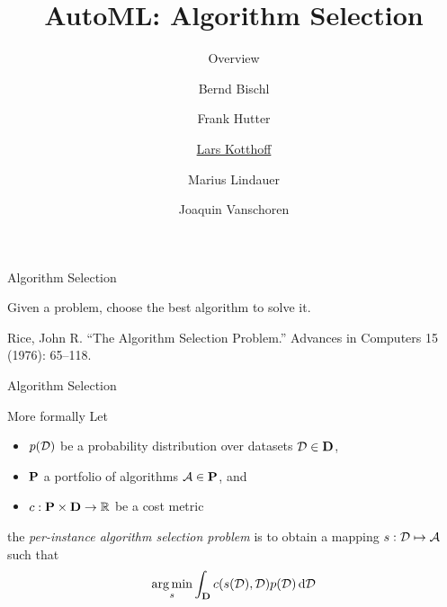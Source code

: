 




\title[AutoML: Overview]{AutoML: Algorithm Selection} %
\subtitle{Overview} %
\author[Marius Lindauer]{Bernd Bischl \and Frank Hutter \and \underline{Lars Kotthoff}\newline \and Marius Lindauer \and Joaquin Vanschoren}
\institute{}
\date{}




\def\blfootnote{}


	
	\maketitle
	


\begin{frame}[c]{Algorithm Selection}
    \begin{center}
        \Large{Given a problem, choose the best algorithm to solve it.}
    \end{center}
    \blfootnote{Rice, John R. ``The Algorithm Selection Problem.'' Advances in
    Computers 15 (1976): 65–118.}
\end{frame}

\begin{frame}[c]{Algorithm Selection}
\begin{block}{More formally}
        Let 
        \begin{itemize}
                \item $p(\mathcal{D})$ be a probability distribution over datasets $\mathcal{D} \in \mathbf{D}$,
                \item $\mathbf{P}$ a portfolio of algorithms $\mathcal{A} \in \mathbf{P}$, and
                \item $c: \mathbf{P} \times \mathbf{D} \rightarrow \mathbb{R}$ be a cost metric   
        \end{itemize}
        
        the \emph{per-instance algorithm selection problem} is to obtain a mapping 
        $s: \mathcal{D} \mapsto \mathcal{A}$ 
        such that
        $$\operatorname*{arg\,min}_{s} \int_{\mathbf{D}} c(s(\mathcal{D}),\mathcal{D}) p(\mathcal{D}) \mathop{}\!\mathrm{d}\mathcal{D}$$
\end{block}

\end{frame}

